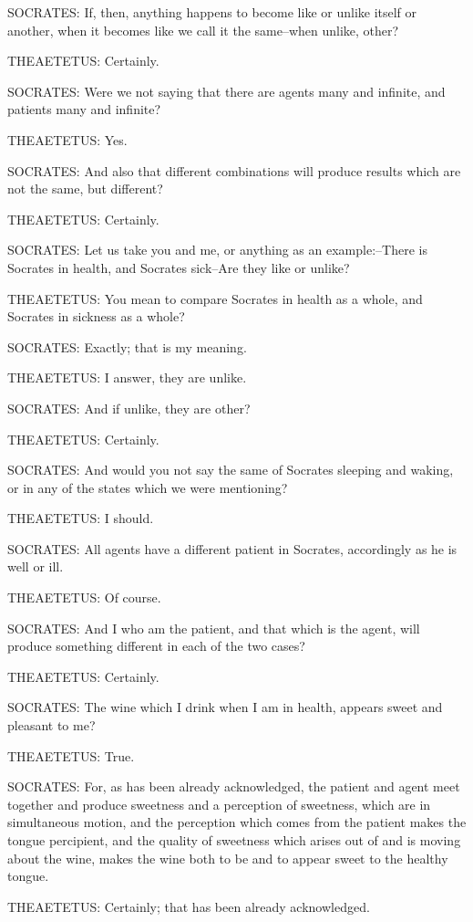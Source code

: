 SOCRATES: If, then, anything happens to become like or unlike itself or
another, when it becomes like we call it the same--when unlike, other?

THEAETETUS: Certainly.

SOCRATES: Were we not saying that there are agents many and infinite,
and patients many and infinite?

THEAETETUS: Yes.

SOCRATES: And also that different combinations will produce results
which are not the same, but different?

THEAETETUS: Certainly.

SOCRATES: Let us take you and me, or anything as an example:--There is
Socrates in health, and Socrates sick--Are they like or unlike?

THEAETETUS: You mean to compare Socrates in health as a whole, and
Socrates in sickness as a whole?

SOCRATES: Exactly; that is my meaning.

THEAETETUS: I answer, they are unlike.

SOCRATES: And if unlike, they are other?

THEAETETUS: Certainly.

SOCRATES: And would you not say the same of Socrates sleeping and
waking, or in any of the states which we were mentioning?

THEAETETUS: I should.

SOCRATES: All agents have a different patient in Socrates, accordingly
as he is well or ill.

THEAETETUS: Of course.

SOCRATES: And I who am the patient, and that which is the agent, will
produce something different in each of the two cases?

THEAETETUS: Certainly.

SOCRATES: The wine which I drink when I am in health, appears sweet and
pleasant to me?

THEAETETUS: True.

SOCRATES: For, as has been already acknowledged, the patient and agent
meet together and produce sweetness and a perception of sweetness, which
are in simultaneous motion, and the perception which comes from the
patient makes the tongue percipient, and the quality of sweetness which
arises out of and is moving about the wine, makes the wine both to be
and to appear sweet to the healthy tongue.

THEAETETUS: Certainly; that has been already acknowledged.

